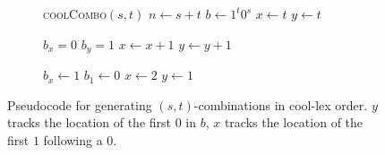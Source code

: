 \begin{figure}[H]
    \centering
    \begin{subfigure}[t]{0.275\textwidth}
        \centering
        \begin{algorithm}[H]
        \begin{algorithmic}
        \State \textsc{coolCombo}$(s,t)$
        \State $n \gets s+t$
        \State $b \gets 1^t 0^s$
        \State $x \gets t$
        \State $y \gets t$
        \State {}
        
            \State $b_x=0$
            \State $b_y=1$
            \State $x \gets x+1$
            \State $y \gets y+1$
            
                \State $b_x \gets 1$ %
                \State $b_1 \gets 0$ %
                    \State $x \gets 2$
                \EndIf
                \State $y \gets 1$
            \EndIf
        \EndWhile
        \end{algorithmic}
        \end{algorithm}

    \end{subfigure}
    \caption[Pseudocode for generating $(s,t)$-combinations in cool-lex order.]{Pseudocode for generating $(s,t)$-combinations in cool-lex order. $y$ tracks the location of the first $0$ in $b$, $x$ tracks the location of the first $1$ following a $0$. }
    \label{fig:coolComboCode}
\end{figure}

